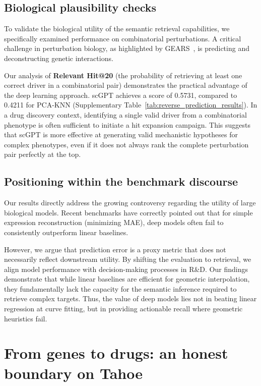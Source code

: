 \documentclass{article}
\begin{document}
\subsection{Biological plausibility checks}

To validate the biological utility of the semantic retrieval capabilities, we specifically examined performance on combinatorial perturbations. A critical challenge in perturbation biology, as highlighted by GEARS~\cite{roohani_predicting_2024}, is predicting and deconstructing genetic interactions.

Our analysis of \textbf{Relevant Hit@20} (the probability of retrieving at least one correct driver in a combinatorial pair) demonstrates the practical advantage of the deep learning approach. scGPT achieves a score of 0.5731, compared to 0.4211 for PCA-KNN (Supplementary Table~\ref{tab:reverse_prediction_results}). In a drug discovery context, identifying a single valid driver from a combinatorial phenotype is often sufficient to initiate a hit expansion campaign. This suggests that scGPT is more effective at generating valid mechanistic hypotheses for complex phenotypes, even if it does not always rank the complete perturbation pair perfectly at the top.

\subsection{Positioning within the benchmark discourse}

Our results directly address the growing controversy regarding the utility of large biological models. Recent benchmarks have correctly pointed out that for simple expression reconstruction (minimizing MAE), deep models often fail to consistently outperform linear baselines.

However, we argue that prediction error is a proxy metric that does not necessarily reflect downstream utility. By shifting the evaluation to retrieval, we align model performance with decision-making processes in R\&D. Our findings demonstrate that while linear baselines are efficient for geometric interpolation, they fundamentally lack the capacity for the semantic inference required to retrieve complex targets. Thus, the value of deep models lies not in beating linear regression at curve fitting, but in providing actionable recall where geometric heuristics fail.


\section{From genes to drugs: an honest boundary on Tahoe}
\end{document}
